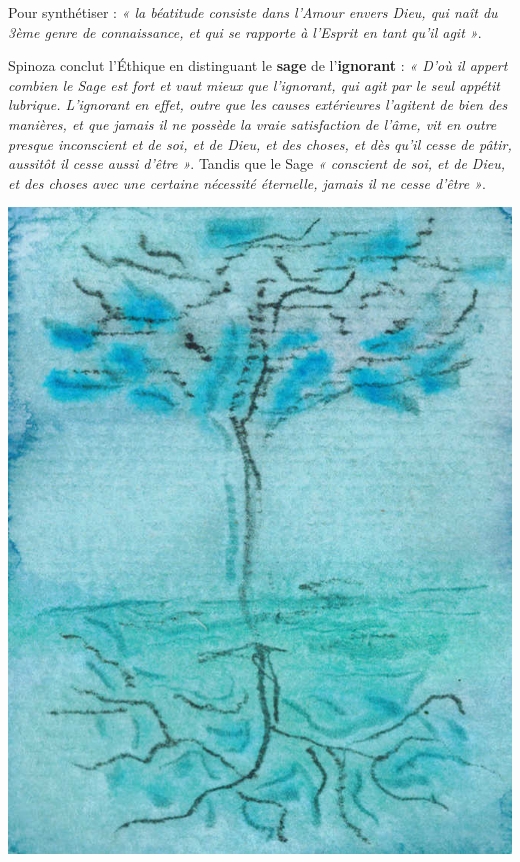 Pour synthétiser : {\it « la béatitude consiste dans l’Amour envers Dieu, qui naît du
3ème genre de connaissance, et qui se rapporte à l’Esprit en tant qu’il agit »}.

Spinoza conclut l’Éthique en distinguant le {\bf sage} de l’{\bf ignorant} : {\it « D’où il
appert combien le Sage est fort et vaut mieux que l’ignorant, qui agit par le
seul appétit lubrique. L’ignorant en effet, outre que les causes extérieures
l’agitent de bien des manières, et que jamais il ne possède la vraie
satisfaction de l’âme, vit en outre presque inconscient et de soi, et de Dieu,
et des choses, et dès qu’il cesse de pâtir, aussitôt il cesse aussi d’être »}.
Tandis que le Sage {\it « conscient de soi, et de Dieu, et des choses avec une
certaine nécessité éternelle, jamais il ne cesse d’être »}.


\vfill

\begin{center}
\includegraphics[scale=1.8]{./ethique/arbre}
\end{center}

\vfill

